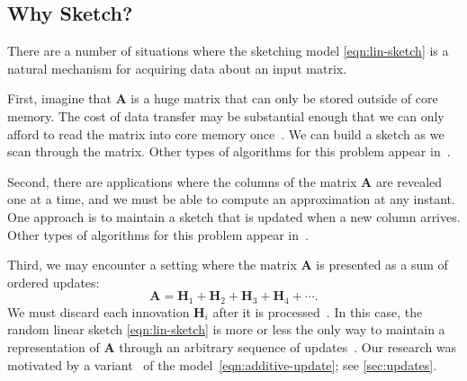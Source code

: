 \documentclass[final]{siamart1116}
\numberwithin{equation}{section}
\numberwithin{theorem}{section}
\numberwithin{figure}{section}
\newcommand{\mtx}[1]{\bm{#1}}
\begin{document}
\subsection{Why Sketch?\nopunct}

There are a number of situations where the sketching model \cref{eqn:lin-sketch}
is a natural mechanism for acquiring data about an input matrix.



First, imagine that $\mtx{A}$ is a huge matrix
that can only be stored outside of core memory.
The cost of data transfer may be substantial
enough that we can only afford to read the matrix
into core memory once~\cite[Sec.~5.5]{HMT11:Finding-Structure}.
We can build a sketch as we scan through the matrix.
Other types of algorithms for this problem appear
in~\cite{FSS12:Turning-Big,FRV16:Dimensionality-Reduction}.



Second, there are applications where the columns of the matrix $\mtx{A}$
are revealed one at a time, and we must be able to compute an approximation at any instant.
One approach is to maintain a sketch that is updated when a new column arrives.
Other types of algorithms for this problem appear
in~\cite{BGKL15:Online-Principal,JJK+16:Streaming-PCA}.

Third, we may encounter a setting where the matrix $\mtx{A}$
is presented as a sum of ordered updates:
\begin{equation} \label{eqn:additive-update}
\mtx{A} = \mtx{H}_1 + \mtx{H}_2 + \mtx{H}_3 + \mtx{H}_4 + \cdots.
\end{equation}
We must discard each innovation $\mtx{H}_i$ after it is
processed~\cite{CW09:Numerical-Linear,Woo14:Sketching-Tool}.
In this case, the random linear sketch \cref{eqn:lin-sketch}
is more or less the only way to maintain a representation
of $\mtx{A}$ through an arbitrary sequence of updates~\cite{LNW14:Turnstile-Streaming}.
Our research was motivated by a variant~\cite{YUTC16:Sketchy-Decisions} of the model~\eqref{eqn:additive-update};
see \cref{sec:updates}.
\end{document}
